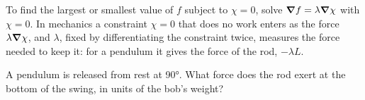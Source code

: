 \begin{keyidea}
To find the largest or smallest value of $f$ subject to $\chi = 0$, solve
$\bm{\nabla} f = \lambda\bm{\nabla}\chi$ with $\chi = 0$. In mechanics a constraint $\chi = 0$
that does no work enters as the force $\lambda\bm{\nabla}\chi$, and $\lambda$,
fixed by differentiating the constraint twice, measures the force needed
to keep it: for a pendulum it gives the force of the rod, $-\lambda L$.
\end{keyidea}


\begin{selfcheck}
A pendulum is released from rest at \ang{90}. What force does the rod
exert at the bottom of the swing, in units of the bob's weight?
\end{selfcheck}
